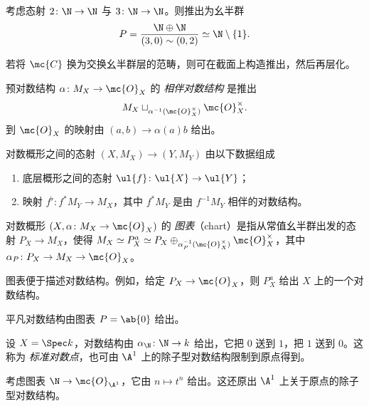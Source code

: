 \begin{exm}
    考虑态射 \(2 \colon \N \to \N\) 与 \(3 \colon \N \to \N\)。则推出为幺半群
    \[ P = \frac{\N \oplus \N}{(3, 0) \sim (0,2)} \simeq \N \setminus \{1\}. \]
\end{exm}

若将 \(\mc{C}\) 换为交换幺半群层的范畴，则可在截面上构造推出，然后再层化。

\begin{defn}
    预对数结构 \(\alpha \colon M_X \to \mc{O}_X\) 的 \textit{相伴对数结构} 是推出 
    \[ M_X \sqcup_{\alpha^{-1}(\mc{O}_X^{\times})} \mc{O}_X^{\times}. \]
    到 \(\mc{O}_X\) 的映射由 \((a,b) \to \alpha(a) b\) 给出。 
\end{defn}

\begin{defn}
    对数概形之间的态射 \((X, M_X) \to (Y, M_Y)\) 由以下数据组成
    \begin{enumerate}
        \item 底层概形之间的态射 \(\ul{f} \colon \ul{X} \to \ul{Y}\)；
        \item 映射 \(f^{\flat} \colon f^* M_Y \to M_X\)，其中 \(f^* M_Y\) 是由 \(f^{-1} M_Y\) 相伴的对数结构。  
    \end{enumerate}
\end{defn}

\begin{defn}
    对数概形 \((X, \alpha \colon M_X \to \mc{O}_X)\) 的 \textit{图表}（chart）是指从常值幺半群出发的态射 \(P_X \to M_X\)，使得 \(M_X \simeq P_X^a \simeq P_X \oplus_{\alpha_P^{-1}(\mc{O}_X^{\times})} \mc{O}_X^{\times}\)，其中 \(\alpha_P \colon P_X \to M_X \to \mc{O}_X\)。
\end{defn}

图表便于描述对数结构。例如，给定 \(P_X \to \mc{O}_X\)，则 \(P_X^a\) 给出 \(X\) 上的一个对数结构。

\begin{exm}
    平凡对数结构由图表 \(P = \ab\{0\}\) 给出。
\end{exm}

\begin{exm}
    设 \(X = \Spec k\)，对数结构由 \(\alpha_{\N} \colon \N \to k\) 给出，它把 \(0\) 送到 \(1\)，把 \(1\) 送到 \(0\)。这称为 \textit{标准对数点}，也可由 \(\A^1\) 上的除子型对数结构限制到原点得到。
\end{exm}

\begin{exm}
    考虑图表 \(\N \to \mc{O}_{\A^1}\)，它由 \(n \mapsto t^n\) 给出。这还原出 \(\A^1\) 上关于原点的除子型对数结构。
\end{exm}

